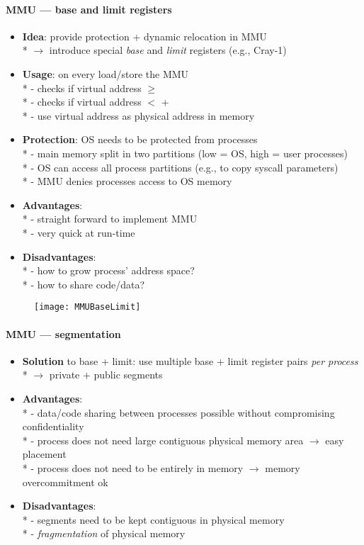 \paragraph{MMU --- base and limit registers}
\begin{itemize}
  \item \textbf{Idea}: provide protection + dynamic relocation in MMU \\*
    \( \to \) introduce special \emph{base} and \emph{limit} registers (e.g., Cray-1)
  \item \textbf{Usage}: on every load/store the MMU \\*
    - checks if virtual address \( \geq \)  \\*
    - checks if virtual address \( < \)  +  \\*
    - use virtual address as physical address in memory
  \item \textbf{Protection}: OS needs to be protected from processes \\*
    - main memory split in two partitions (low = OS, high = user processes) \\*
    - OS can access all process partitions (e.g., to copy syscall parameters) \\*
    - MMU denies processes access to OS memory
  \item \textbf{Advantages}: \\*
    - straight forward to implement MMU \\*
    - very quick at run-time
  \item \textbf{Disadvantages}: \\*
    - how to grow process' address space? \\*
    - how to share code/data?
\end{itemize}
\begin{figure}[h]\centering\label{MMUBaseLimit}\texttt{[image: MMUBaseLimit]}\end{figure}

\paragraph{MMU --- segmentation}
\begin{itemize}
  \item \textbf{Solution} to base + limit: use multiple base + limit register pairs \emph{per process} \\*
  \( \to \) private + public segments
  \item \textbf{Advantages}: \\*
    - data/code sharing between processes possible without compromising confidentiality \\*
    - process does not need large contiguous physical memory area \( \to \) easy placement \\*
    - process does not need to be entirely in memory \( \to \) memory overcommitment ok
  \item \textbf{Disadvantages}: \\*
    - segments need to be kept contiguous in physical memory \\*
    - \emph{fragmentation} of physical memory
\end{itemize}

